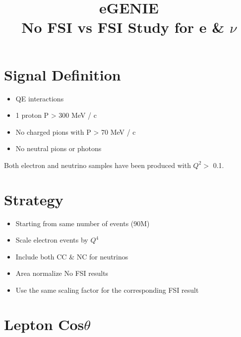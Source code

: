 \documentclass[a4paper]{article}
\title{\vspace{-2cm}\Huge{\textbf{eGENIE\\No FSI vs FSI Study for e \& $\nu$}}}
\author{}
\begin{document}

\maketitle

 \justify


\section{Signal Definition} \label{Signal}

\begin{itemize}
  \item QE interactions
  \item 1 proton P > 300 MeV / c
  \item No charged pions with P > 70 MeV / c
  \item No neutral pions or photons
\end{itemize}

Both electron and neutrino samples have been produced with $Q^{2} >$ 0.1. 


\section{Strategy} \label{Strategy}

\begin{itemize}
   \item Starting from same number of events (90M)
   \item Scale electron events by $Q^{4}$
   \item Include both CC \& NC for neutrinos
   \item Area normalize No FSI results
   \item Use the same scaling factor for the corresponding FSI result
\end{itemize}

\clearpage 


\section{Lepton Cos$\theta$} \label{LepCos}
\end{document}
